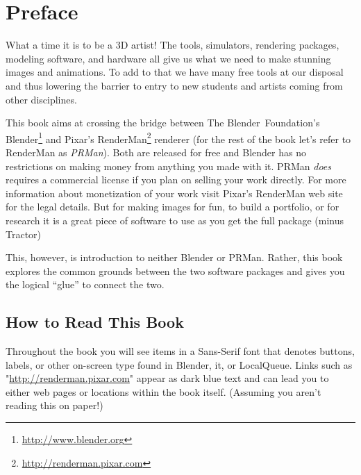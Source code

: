 \chapter*{Preface}
What a time it is to be a 3D artist!  The tools, simulators, rendering packages, modeling software, and hardware all give us what we need to make stunning images and animations.  To add to that we have many free tools at our disposal and thus lowering the barrier to entry to new students and artists coming from other disciplines.

This book aims at crossing the bridge between The \mbox{Blender Foundation's} Blender\footnote{\url{http://www.blender.org}} and Pixar's RenderMan\footnote{\url{http://renderman.pixar.com}} renderer (for the rest of the book let's refer to RenderMan as \emph{PRMan}).  Both are released for free and  Blender has no restrictions on making money from anything you made with it.   PRMan \emph{does} requires a commercial license if you plan on selling your work directly.  For more information about monetization of your work visit Pixar's RenderMan web site for the legal details.  But for making images for fun, to build a portfolio, or for research it is a great piece of software to use as you get the full package (minus Tractor)

This, however, is introduction to neither Blender or PRMan.  Rather, this book explores the common grounds between the two software packages and gives you the logical ``glue'' to connect the two.

\section*{How to Read This Book}
Throughout the book you will see items in a \textsf{Sans-Serif} font that denotes buttons, labels, or other on-screen type found in Blender, it, or LocalQueue.
Links such as "\url{http://renderman.pixar.com}" appear as dark blue text and can lead you to either web pages or locations within the book itself.  (Assuming you aren't reading this on paper!)


